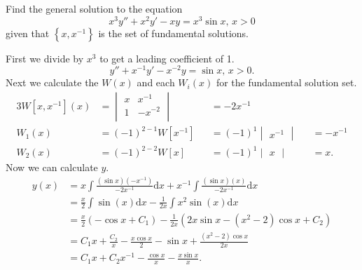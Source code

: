 \begin{example}
	Find the general solution to the equation
	\begin{equation*}
		x^3y'' + x^2y' - xy = x^3\sin{x} \text{, } x > 0
	\end{equation*}
	given that $\left\{x, x^{-1}\right\}$ is the set of fundamental solutions.
\end{example}
\noindent
First we divide by $x^3$ to get a leading coefficient of 1.
\begin{equation*}
	y'' + x^{-1}y' - x^{-2}y = \sin{x} \text{, } x > 0.
\end{equation*}
Next we calculate the $W(x)$ and each $W_i(x)$ for the fundamental solution set.
\begin{alignat*}{3}
	W[x,x^{-1}](x) &= \begin{vmatrix}
		x & x^{-1} \\
		1 & -x^{-2} \\
	\end{vmatrix} &&= -2x^{-1} \\
	W_1(x) &= (-1)^{2-1}W[x^{-1}] &&= (-1)^{1}\begin{vmatrix}
		x^{-1}
	\end{vmatrix} &&= -x^{-1} \\
	W_2(x) &= (-1)^{2-2}W[x] &&= (-1)^{1}\begin{vmatrix}
		x
	\end{vmatrix} &&= x.
\end{alignat*}
Now we can calculate $y$.
\begin{align*}
	y(x) &= x\int{\frac{(\sin{x})(-x^{-1})}{-2x^{-1}} \mathrm{d}x} + x^{-1}\int{\frac{(\sin{x})(x)}{-2x^{-1}} \mathrm{d}x} \\
	&= \frac{x}{2}\int{\sin{(x)}\mathrm{d}x} - \frac{1}{2x}\int{x^2\sin{(x)}\mathrm{d}x} \\
	&= \frac{x}{2}\left(-\cos{x}+C_1\right) - \frac{1}{2x}\left(2x\sin{x} - (x^2-2)\cos{x} + C_2\right) \\
	&= C_1x + \frac{C_2}{x} -\frac{x\cos{x}}{2} - \sin{x} + \frac{(x^2-2)\cos{x}}{2x} \\
	&= C_1x + C_2x^{-1} - \frac{\cos{x}}{x} - \frac{x\sin{x}}{x}.
\end{align*}